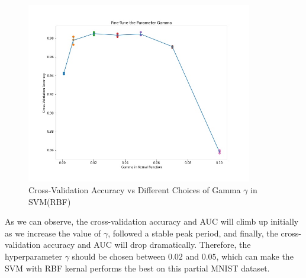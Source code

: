 \documentclass[a4paper,12pt]{article} %
\begin{document}
\begin{figure}[!htbp]
	\centering
	\includegraphics[width=0.88\textwidth]{FT2.jpg}
	\caption{Cross-Validation Accuracy vs Different Choices of Gamma $\gamma$ in SVM(RBF)}
	\label{fig:ft2}
\end{figure}

\hspace{0.7cm}
As we can observe, the cross-validation accuracy and AUC will climb up initially as we increase the value of $\gamma$, followed a stable peak period, and finally, the cross-validation accuracy and AUC will drop dramatically. Therefore, the hyperparameter $\gamma$ should be chosen between $0.02$ and $0.05$, which can make the SVM with RBF kernal performs the best on this partial MNIST dataset.
\end{document}
